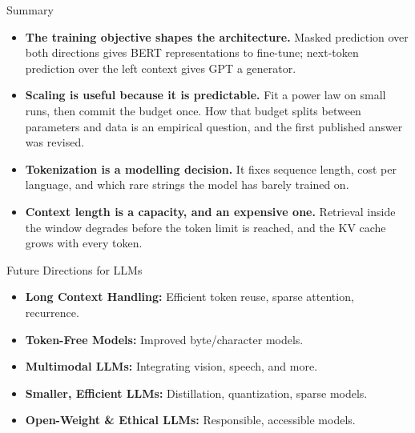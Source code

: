 \begin{frame}{Summary}
  \begin{itemize}\itemsep0.4em
    \item[\textcolor{red}{$\blacktriangleright$}] \textbf{The training objective shapes the architecture.} Masked prediction over both directions gives BERT representations to fine-tune; next-token prediction over the left context gives GPT a generator.
    \item[\textcolor{red}{$\blacktriangleright$}] \textbf{Scaling is useful because it is predictable.} Fit a power law on small runs, then commit the budget once. How that budget splits between parameters and data is an empirical question, and the first published answer was revised.
    \item[\textcolor{red}{$\blacktriangleright$}] \textbf{Tokenization is a modelling decision.} It fixes sequence length, cost per language, and which rare strings the model has barely trained on.
    \item[\textcolor{red}{$\blacktriangleright$}] \textbf{Context length is a capacity, and an expensive one.} Retrieval inside the window degrades before the token limit is reached, and the KV cache grows with every token.
  \end{itemize}
\end{frame}

\begin{frame}{Future Directions for LLMs}
  \begin{itemize}
    \item[\textcolor{red}{$\blacktriangleright$}] \textbf{Long Context Handling:} Efficient token reuse, sparse attention, recurrence.
    \item[\textcolor{red}{$\blacktriangleright$}] \textbf{Token-Free Models:} Improved byte/character models.
    \item[\textcolor{red}{$\blacktriangleright$}] \textbf{Multimodal LLMs:} Integrating vision, speech, and more.
    \item[\textcolor{red}{$\blacktriangleright$}] \textbf{Smaller, Efficient LLMs:} Distillation, quantization, sparse models.
    \item[\textcolor{red}{$\blacktriangleright$}] \textbf{Open-Weight \& Ethical LLMs:} Responsible, accessible models.
  \end{itemize}
\end{frame}
